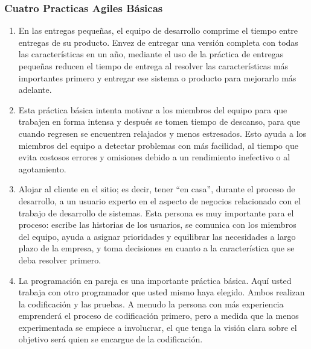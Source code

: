 \subsubsection{Cuatro Practicas Agiles  Básicas }
\begin{enumerate}
\item En las entregas pequeñas, el equipo de desarrollo comprime el tiempo entre entregas de su producto. Envez de entregar una versión completa con todas las características en un año, mediante el uso de la práctica de entregas pequeñas reducen el tiempo de entrega al resolver las características más importantes primero y entregar ese sistema o producto para mejorarlo más adelante.
\item Esta práctica básica intenta motivar a los miembros del equipo para que trabajen en forma intensa y después se tomen tiempo de descanso, para que cuando regresen se encuentren relajados y menos estresados. Esto ayuda a los miembros del equipo a detectar problemas con más facilidad, al tiempo que evita costosos errores y omisiones debido a un rendimiento inefectivo o al agotamiento.
\item Alojar al cliente en el sitio; es decir, tener “en casa”, durante el proceso de desarrollo, a un usuario experto en el aspecto de negocios relacionado con el trabajo de desarrollo de sistemas. Esta persona es muy importante para el proceso: escribe las historias de los usuarios, se comunica con los miembros del equipo, ayuda a asignar prioridades y equilibrar las necesidades a largo plazo de la empresa, y toma decisiones en cuanto a la característica que se deba resolver primero.
\item La programación en pareja es una importante práctica básica. Aquí usted trabaja con otro programador que usted mismo haya elegido. Ambos realizan la codificación y las pruebas. A menudo la persona con más experiencia emprenderá el proceso de codificación primero, pero a medida que la menos experimentada se empiece a involucrar, el que tenga la visión clara sobre el objetivo será quien se encargue de la codificación.
\end{enumerate}

